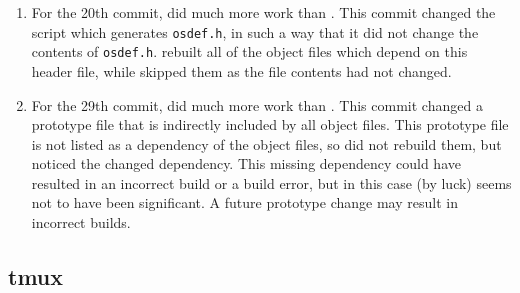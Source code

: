 \begin{enumerate}
\item For the 20th commit, \Make did much more work than \Rattle. This commit changed the script which generates \texttt{osdef.h}, in such a way that it did not change the contents of \texttt{osdef.h}. \Make rebuilt all of the object files which depend on this header file, while \Rattle skipped them as the file contents had not changed.
\item For the 29th commit, \Rattle did much more work than \Make. This commit changed a prototype file that is indirectly included by all object files.  This prototype file is not listed as a dependency of the object files, so \Make did not rebuild them, but \Rattle noticed the changed dependency.  This missing dependency could have resulted in an incorrect build or a build error, but in this case (by luck) seems not to have been significant. A future prototype change may result in incorrect builds.
\end{enumerate}


\subsection{tmux}
\label{sec:eval:tmux}




